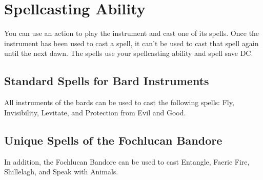 \section*{Spellcasting Ability}
You can use an action to play the instrument and cast one of its spells. Once the instrument has been used to cast a spell, it can't be used to cast that spell again until the next dawn. The spells use your spellcasting ability and spell save DC.
\subsection*{Standard Spells for Bard Instruments}
All instruments of the bards can be used to cast the following spells: Fly, Invisibility, Levitate, and Protection from Evil and Good.
\subsection*{Unique Spells of the Fochlucan Bandore}
In addition, the Fochlucan Bandore can be used to cast Entangle, Faerie Fire, Shillelagh, and Speak with Animals.